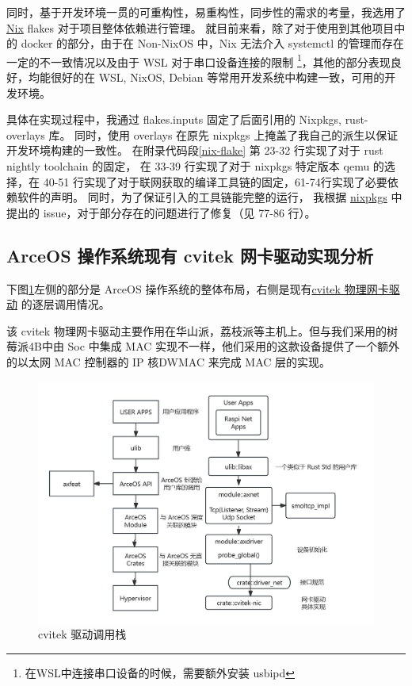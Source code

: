     同时，基于开发环境一贯的可重构性，易重构性，同步性的需求的考量，我选用了 \href{https://nixos.org/}{Nix} flakes 对于项目整体依赖进行管理。
    就目前来看，除了对于使用到其他项目中的 docker 的部分，由于在 Non-NixOS 中，Nix 无法介入 systemctl 的管理而存在一定的不一致情况以及由于 WSL 对于串口设备连接的限制
    \footnote{在WSL中连接串口设备的时候，需要额外安装 usbipd}，其他的部分表现良好，均能很好的在 WSL, NixOS, Debian 等常用开发系统中构建一致，可用的开发环境。

    具体在实现过程中，我通过 flakes.inputs 固定了后面引用的 Nixpkgs, rust-overlays 库。
    同时，使用 overlays 在原先 nixpkgs 上掩盖了我自己的派生以保证开发环境构建的一致性。
    在附录代码段\ref{nix-flake} 第 23-32 行实现了对于 rust nightly toolchain 的固定，
    在 33-39 行实现了对于 nixpkgs 特定版本 qemu 的选择，在 40-51 行实现了对于联网获取的编译工具链的固定，61-74行实现了必要依赖软件的声明。
    同时，为了保证引入的工具链能完整的运行，
    我根据 \href{https://github.com/nixos/nixpkgs}{nixpkgs} 中提出的 issue，对于部分存在的问题进行了修复（见 77-86 行）。

\subsection{ArceOS 操作系统现有 cvitek 网卡驱动实现分析}

    下图\ref{fig::cvitek}左侧的部分是 ArceOS 操作系统的整体布局，右侧是现有\href{https://github.com/yuoo655/arceos_net/tree/hsp}{cvitek 物理网卡驱动} 的逐层调用情况。

    该 cvitek 物理网卡驱动主要作用在华山派，荔枝派等主机上。但与我们采用的树莓派4B中由 Soc 中集成 MAC 实现不一样，他们采用的这款设备提供了一个额外的以太网 MAC 控制器的 IP 核DWMAC 来完成 MAC 层的实现。

        
    \begin{figure}[ht]
        \centering
        \caption{cvitek 驱动调用栈}    \label{fig::cvitek}
        \includegraphics[scale=0.4]{imgs/cvitek.jpg}
    \end{figure}

